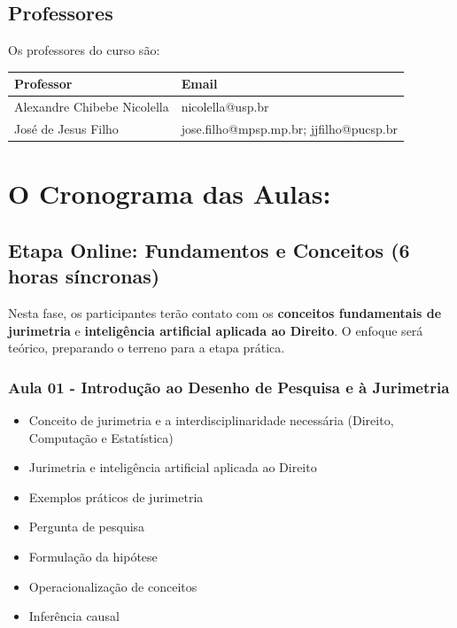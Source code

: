 \documentclass[
  letterpaper,
  DIV=11,
  numbers=noendperiod]{scrreprt}
\providecommand{\tightlist}{%
  \setlength{\itemsep}{0pt}\setlength{\parskip}{0pt}}
\begin{document}
\section{\texorpdfstring{\textbf{Professores}}{Professores}}\label{professores}

Os professores do curso são:

\begin{longtable}[]{@{}ll@{}}
\toprule\noalign{}
Professor & Email \\
\midrule\noalign{}
\endhead
\bottomrule\noalign{}
\endlastfoot
Alexandre Chibebe Nicolella & nicolella@usp.br \\
José de Jesus Filho & jose.filho@mpsp.mp.br; jjfilho@pucsp.br \\
\end{longtable}


\chapter{O Cronograma das Aulas:}\label{o-cronograma-das-aulas}

\section{Etapa Online: Fundamentos e Conceitos (6 horas
síncronas)}\label{etapa-online-fundamentos-e-conceitos-6-horas-suxedncronas}

Nesta fase, os participantes terão contato com os \textbf{conceitos
fundamentais de jurimetria} e \textbf{inteligência artificial aplicada
ao Direito}. O enfoque será teórico, preparando o terreno para a etapa
prática.

\subsection{Aula 01 - Introdução ao Desenho de Pesquisa e à
Jurimetria}\label{aula-01---introduuxe7uxe3o-ao-desenho-de-pesquisa-e-uxe0-jurimetria}

\begin{itemize}
\tightlist
\item
  Conceito de jurimetria e a interdisciplinaridade necessária (Direito,
  Computação e Estatística)\\
\item
  Jurimetria e inteligência artificial aplicada ao Direito\\
\item
  Exemplos práticos de jurimetria
\item
  Pergunta de pesquisa\\
\item
  Formulação da hipótese\\
\item
  Operacionalização de conceitos\\
\item
  Inferência causal
\end{itemize}
\end{document}
